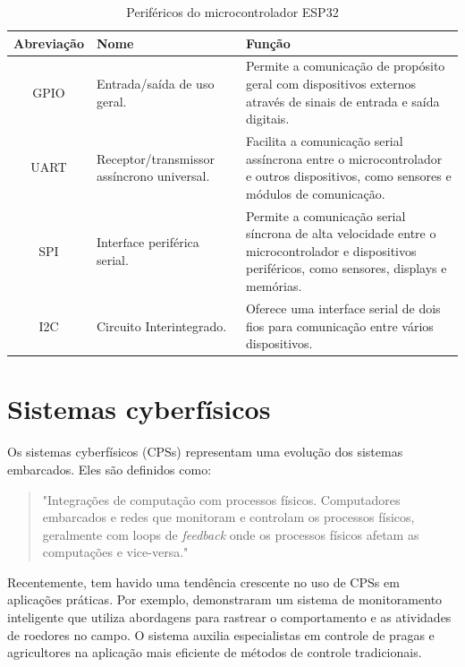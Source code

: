 \begin{table}[!htb]
  \caption{Periféricos do microcontrolador ESP32} \label{tab:esp32_perifericos}
  \begin{tabularx}{\textwidth}{|c|X|X|} \hline
    \textbf{Abreviação} & \textbf{Nome} & \textbf{Função} \\ \hline
    GPIO & Entrada/saída de uso geral. & Permite a comunicação de propósito geral com dispositivos externos através de sinais de entrada e saída digitais.  \\ \hline
    UART & Receptor/transmissor assíncrono universal. & Facilita a comunicação serial assíncrona entre o microcontrolador e outros dispositivos, como sensores e módulos de comunicação. \\ \hline
    SPI & Interface periférica serial. & Permite a comunicação serial síncrona de alta velocidade entre o microcontrolador e dispositivos periféricos, como sensores, displays e memórias. \\ \hline
    I2C & Circuito Interintegrado. & Oferece uma interface serial de dois fios para comunicação entre vários dispositivos. \\ \hline
  \end{tabularx}
\end{table}

\section{Sistemas cyberfísicos}

Os sistemas cyberfísicos (CPSs) representam uma evolução dos sistemas embarcados. Eles são definidos como:

\begin{quote}
"Integrações de computação com processos físicos. Computadores embarcados e redes que monitoram e controlam os processos físicos, geralmente com loops de \textit{feedback} onde os processos físicos afetam as computações e vice-versa." \parencite{lee2008cyber}
\end{quote}

Recentemente, tem havido uma tendência crescente no uso de CPSs em aplicações práticas. Por exemplo, \textcite{ahmad2020smart} demonstraram um sistema de monitoramento inteligente que utiliza abordagens para rastrear o comportamento e as atividades de roedores no campo. O sistema auxilia especialistas em controle de pragas e agricultores na aplicação mais eficiente de métodos de controle tradicionais.

